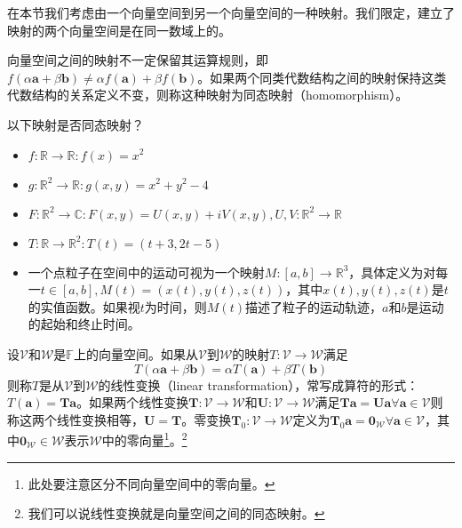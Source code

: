 \documentclass[main.tex]{subfiles}
\begin{document}
在本节我们考虑由一个向量空间到另一个向量空间的一种映射。我们限定，建立了映射的两个向量空间是在同一数域上的。

向量空间之间的映射不一定保留其运算规则，即$f\left(\alpha\mathbf{a}+\beta\mathbf{b}\right)\neq\alpha f\left(\mathbf{a}\right)+\beta f\left(\mathbf{b}\right)$。如果两个同类代数结构之间的映射保持这类代数结构的关系定义不变，则称这种映射为同态映射（homomorphism）。
\begin{example}
以下映射是否同态映射？
\begin{itemize}
    \item $f:\mathbb{R}\rightarrow\mathbb{R}:f\left(x\right)=x^2$
    \item $g:\mathbb{R}^2\rightarrow\mathbb{R}:g\left(x,y\right)=x^2+y^2-4$
    \item $F:\mathbb{R}^2\rightarrow\mathbb{C}:F\left(x,y\right)=U\left(x,y\right)+iV\left(x,y\right),U,V:\mathbb{R}^2\rightarrow\mathbb{R}$
    \item $T:\mathbb{R}\rightarrow\mathbb{R}^2:T\left(t\right)=\left(t+3,2t-5\right)$
    \item 一个点粒子在空间中的运动可视为一个映射$M:\left[a,b\right]\rightarrow\mathbb{R}^3$，具体定义为对每一$t\in\left[a,b\right],M\left(t\right)=\left(x\left(t\right),y\left(t\right),z\left(t\right)\right)$，其中$x\left(t\right),y\left(t\right),z\left(t\right)$是$t$的实值函数。如果视$t$为时间，则$M\left(t\right)$描述了粒子的运动轨迹，$a$和$b$是运动的起始和终止时间。
\end{itemize}
\end{example}

\begin{definition}[线性变换]\label{def:II.4.1}
设$\mathcal{V}$和$\mathcal{W}$是$\mathbb{F}$上的向量空间。如果从$\mathcal{V}$到$\mathcal{W}$的映射$T:\mathcal{V}\rightarrow\mathcal{W}$满足
\[T\left(\alpha\mathbf{a}+\beta\mathbf{b}\right)=\alpha T\left(\mathbf{a}\right)+\beta T\left(\mathbf{b}\right)\]
则称$T$是从$\mathcal{V}$到$\mathcal{W}$的线性变换（linear transformation），常写成算符的形式：$T\left(\mathbf{a}\right)=\mathbf{Ta}$。如果两个线性变换$\mathbf{T}:\mathcal{V}\rightarrow\mathcal{W}$和$\mathbf{U}:\mathcal{V}\rightarrow\mathcal{W}$满足$\mathbf{Ta}=\mathbf{Ua}\forall\mathbf{a}\in\mathcal{V}$则称这两个线性变换相等，$\mathbf{U}=\mathbf{T}$。零变换$\mathbf{T}_0:\mathcal{V}\rightarrow\mathcal{W}$定义为$\mathbf{T}_0\mathbf{a}=\mathbf{0}_\mathcal{W}\forall\mathbf{a}\in\mathcal{V}$，其中$\mathbf{0}_\mathcal{W}\in\mathcal{W}$表示$\mathcal{W}$中的零向量\footnote{此处要注意区分不同向量空间中的零向量。}。\footnote{我们可以说线性变换就是向量空间之间的同态映射。}
\end{definition}
\end{document}
